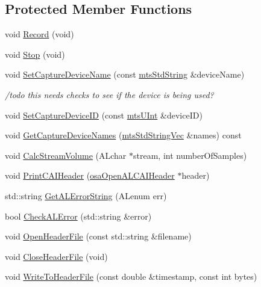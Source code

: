 \subsection*{Protected Member Functions}
\begin{DoxyCompactItemize}
\item 
void \hyperlink{classmts_open_a_l_record_a94fc75ab447960990767227c7c86a0fd}{Record} (void)
\item 
void \hyperlink{classmts_open_a_l_record_a6d54a48f9f78be6796632ced51aac3cc}{Stop} (void)
\item 
void \hyperlink{classmts_open_a_l_record_a1bd95a51a00ef828d504b7ee075f414c}{Set\-Capture\-Device\-Name} (const \hyperlink{mts_generic_object_proxy_8h_adbc21bfbf98367e582bf8a263b7e711f}{mts\-Std\-String} \&device\-Name)
\begin{DoxyCompactList}\small\item\em /todo this needs checks to see if the device is being used? \end{DoxyCompactList}\item 
void \hyperlink{classmts_open_a_l_record_a30449d511adcb2bd8232693e2e55502a}{Set\-Capture\-Device\-I\-D} (const \hyperlink{mts_generic_object_proxy_8h_aa17aa0caae80dcf94844f2bd9942adba}{mts\-U\-Int} \&device\-I\-D)
\item 
void \hyperlink{classmts_open_a_l_record_aa83b5cf8e8264a5a82543982031e3c37}{Get\-Capture\-Device\-Names} (\hyperlink{mts_vector_8h_accf55f170c81d5578af841b3adeaf24e}{mts\-Std\-String\-Vec} \&names) const 
\item 
void \hyperlink{classmts_open_a_l_record_aa5648303f30fa54768c73eba92ce1078}{Calc\-Stream\-Volume} (A\-Lchar $\ast$stream, int number\-Of\-Samples)
\item 
void \hyperlink{classmts_open_a_l_record_adaa713cebec6e3ef881fda1c253c077f}{Print\-C\-A\-I\-Header} (\hyperlink{structosa_open_a_l_c_a_i_header}{osa\-Open\-A\-L\-C\-A\-I\-Header} $\ast$header)
\item 
std\-::string \hyperlink{classmts_open_a_l_record_a67969fa07e4a4b9f4296b5a87a778713}{Get\-A\-L\-Error\-String} (A\-Lenum err)
\item 
bool \hyperlink{classmts_open_a_l_record_a268351553e0ac70e92bf1186f68e7485}{Check\-A\-L\-Error} (std\-::string \&error)
\item 
void \hyperlink{classmts_open_a_l_record_a8c614504fcc551de4fdff600489fb346}{Open\-Header\-File} (const std\-::string \&filename)
\item 
void \hyperlink{classmts_open_a_l_record_a672e1d4baff68d8b92e5f349db4389ad}{Close\-Header\-File} (void)
\item 
void \hyperlink{classmts_open_a_l_record_a03ddab803a649ff0e4aaaa9076d25959}{Write\-To\-Header\-File} (const double \&timestamp, const int bytes)
\end{DoxyCompactItemize}
